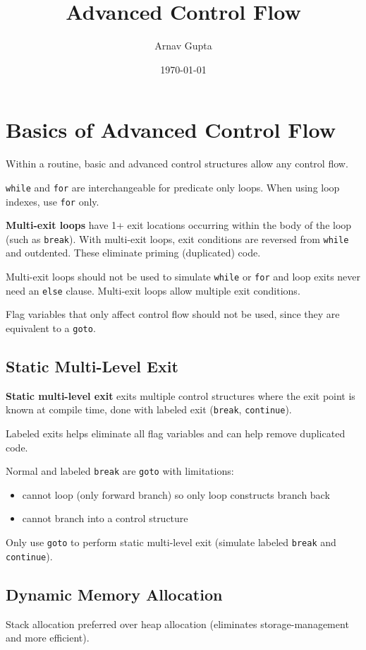 \documentclass[11pt]{article}
\author{Arnav Gupta}
\date{\today}
\title{Advanced Control Flow}
\begin{document}
\maketitle
\tableofcontents

\section{Basics of Advanced Control Flow}
\label{sec:org38e0b80}
Within a routine, basic and advanced control structures allow any control flow.

\texttt{while} and \texttt{for} are interchangeable for predicate only loops. When using loop indexes, use \texttt{for} only.

\textbf{Multi-exit loops} have 1+ exit locations occurring within the body of the loop (such as \texttt{break}).
With multi-exit loops, exit conditions are reversed from \texttt{while} and outdented. These eliminate priming
(duplicated) code.

Multi-exit loops should not be used to simulate \texttt{while} or \texttt{for} and loop exits never need an \texttt{else} clause.
Multi-exit loops allow multiple exit conditions.

Flag variables that only affect control flow should not be used, since they are equivalent to a \texttt{goto}.
\subsection{Static Multi-Level Exit}
\label{sec:org17a7371}
\textbf{Static multi-level exit} exits multiple control structures where the exit point is known at compile time, done with labeled exit (\texttt{break}, \texttt{continue}).

Labeled exits helps eliminate all flag variables and can help remove duplicated code.

Normal and labeled \texttt{break} are \texttt{goto} with limitations:
\begin{itemize}
\item cannot loop (only forward branch) so only loop constructs branch back
\item cannot branch into a control structure
\end{itemize}

Only use \texttt{goto} to perform static multi-level exit (simulate labeled \texttt{break} and \texttt{continue}).
\subsection{Dynamic Memory Allocation}
\label{sec:orgd5a32ed}
Stack allocation preferred over heap allocation (eliminates storage-management and more efficient).
\end{document}
